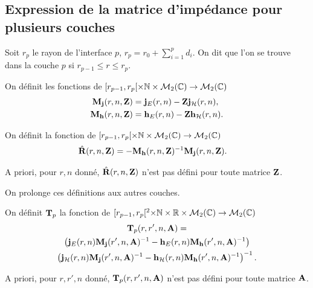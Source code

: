   \subsection{Expression de la matrice d'impédance pour plusieurs couches}

    \begin{figure}[!hbt]
      \centering
      \begin{tikzpicture}
        
      \end{tikzpicture}
    \end{figure}

    Soit \(r_p\) le rayon de l'interface \(p\), \(r_p = r_0 +\sum_{i=1}^{p} d_{i}\). On dit que l'on se trouve dans la couche \(p\) si \(r_{p-1} \le r \le r_p \).

    \begin{defn}
      \label{def:sphere:matrices_MJ-MH}
      On définit les fonctions de \([r_{p-1}, r_p[\times \NN \times \mathcal{M}_{2}(\CC) \rightarrow \mathcal{M}_{2}(\CC)\)
      \begin{align*}
        \mM_{\mj}(r,n,\mZ) &= \mj_{E}(r,n) -  \mZ \mj_{\cH}(r,n),
        \\
        \mM_{\mh}(r,n,\mZ) &= \mh_{E}(r,n) -  \mZ \mh_{\cH}(r,n).
      \end{align*}
    \end{defn}

    \begin{defn}
      \label{def:sphere:reflexion:impedance}
      On définit la fonction de \([r_{p-1}, r_p[\times \NN \times \mathcal{M}_{2}(\CC) \rightarrow \mathcal{M}_{2}(\CC)\)
      \begin{align*}
        \hat\mR(r,n,\mZ) &= -\mM_{\mh}(r,n,\mZ)^{-1}\mM_{\mj}(r,n,\mZ).
      \end{align*}
    \end{defn}
    A priori, pour \(r,n\) donné, \(\hat\mR(r,n,\mZ)\) n'est pas défini pour toute matrice \(\mZ\).

    On prolonge ces définitions aux autres couches.

    \begin{defn}%
      \label{def:sphere:transfert:impedance}

      On définit \(\mT_p\) la fonction de \([r_{p-1}, r_p[^2\times\NN\times\RR\times\mathcal{M}_2(\CC)\rightarrow \mathcal{M}_{2}(\CC)\)
      \begin{multline*}
        \mT_p(r,r',n,\mA) = \\
          \left(\mj_{E}(r,n)\mM_{\mj}(r',n,\mA)^{-1} - \mh_{E}(r,n)\mM_{\mh}(r',n,\mA)^{-1}\right) 
          \\
          \left(\mj_{\cH}(r,n)\mM_{\mj}(r',n,\mA)^{-1} - \mh_{\cH}(r,n)\mM_{\mh}(r',n,\mA)^{-1}\right)^{-1}.
      \end{multline*}
    \end{defn}
    A priori, pour \(r,r',n\) donné, \(\mT_p(r,r',n,\mA)\) n'est pas défini pour toute matrice \(\mA\).


